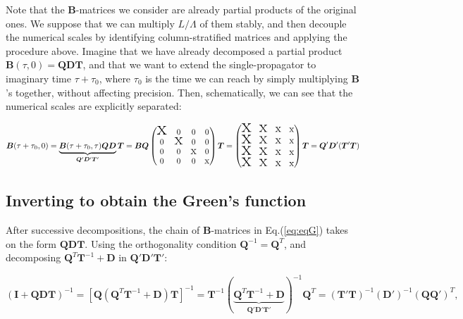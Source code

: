 Note that the $\bm B$-matrices we consider are already partial products of the original ones.
We suppose that we can multiply $L / \Lambda $ of them stably, and then decouple the numerical scales by identifying column-stratified matrices and applying the procedure above.
Imagine that we have already decomposed a partial product $\bm B ( \tau, 0 ) = \bm Q \bm D \bm T$, and that we want to extend the single-propagator to imaginary time $\tau + \tau_0$, where $\tau_0$ is the time we can reach by simply multiplying $\bm B$'s together, without affecting precision.
Then, schematically, we can see that the numerical scales are explicitly separated:

\begin{equation}
\bm B ( \tau + \tau_0 , 0 ) = \underbrace{\bm B ( \tau + \tau_0, \tau ) \bm Q \bm D}_{\bm Q' \bm D' \bm T'} \bm T = 
\bm B \bm Q \begin{pmatrix}
$$ \mbox{\Huge x} $$ & 0 & 0 & 0 \\
0 & $$ \mbox{\huge x} $$ & 0 & 0 \\
0 & 0 & $$ \mbox{\Large x} $$ & 0 \\ 
0 & 0 & 0 & $$ \mbox{\large x} $$
\end{pmatrix} \bm T = 
\begin{pmatrix}
$$ \mbox{\Huge x} $$ & $$ \mbox{\huge x} $$ & $$ \mbox{\Large x} $$ & $$ \mbox{\large x} $$\\
$$ \mbox{\Huge x} $$ & $$ \mbox{\huge x} $$ & $$ \mbox{\Large x} $$ & $$ \mbox{\large x} $$ \\
$$ \mbox{\Huge x} $$ & $$ \mbox{\huge x} $$ & $$ \mbox{\Large x} $$ & $$ \mbox{\large x} $$ \\ 
$$ \mbox{\Huge x} $$ & $$ \mbox{\huge x} $$ & $$ \mbox{\Large x} $$ & $$ \mbox{\large x} $$
\end{pmatrix} \bm T
=  \bm Q' \bm D' ( \bm T'  \bm T )
\end{equation}

\subsection{Inverting to obtain the Green's function}
\label{subsec:invertToG}

After successive decompositions, the chain of $\bm B$-matrices in Eq.(\ref{eq:eqG}) takes on the form $\bm Q \bm D \bm T$.
Using the orthogonality condition $\bm Q^{-1} = \bm Q^T$, and decomposing $\bm Q^T \bm T^{-1} + \bm D$ in $\bm Q' \bm D' \bm T'$:

\begin{equation}
( \bm I + \bm Q \bm D \bm T )^{-1} = [ \bm Q ( 
\bm Q^T \bm T^{-1} + \bm D ) \bm T ]^{-1} = \bm T^{-1} ( \underbrace{\bm Q^T \bm T^{-1} + \bm D}_{\bm Q' \bm D' \bm T'} )^{-1} \bm Q^T = ( \bm T' \bm T )^{-1} (\bm D')^{-1} (\bm Q \bm Q')^{T} ,
\end{equation}

